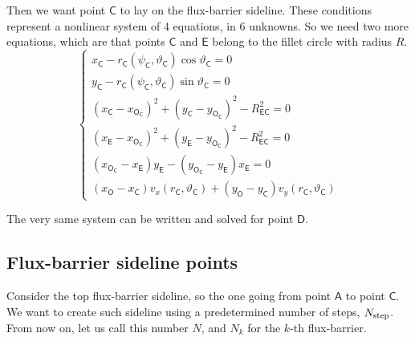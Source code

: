 \documentclass[b5paper,11pt,oneside,fleqn]{article}
\newcommand{\pt}[1]{\mathsf{#1}}
\newcommand{\te}{\vartheta}
\newcommand{\Nstep}{N_{\textup{step}}}
\begin{document}
Then we want point $ \pt{C} $ to lay on the flux-barrier sideline. These
conditions represent a nonlinear system of 4 equations, in 6 unknowns.
So we need two more equations, which are that points $ \pt{C} $ and $ \pt{E} $
belong to the fillet circle with radius $ R $.
\begin{equation}
\begin{cases}
x_\pt{C} - r_\pt{C}(\psi_\pt{C}, \te_\pt{C}) \cos\te_\pt{C} = 0 \\
y_\pt{C} - r_\pt{C}(\psi_\pt{C}, \te_\pt{C}) \sin\te_\pt{C} = 0 \\
%
(x_\pt{C} - x_\pt{O_\pt{C}})^2 + (y_\pt{C} - y_\pt{O_\pt{C}})^2
- R_\pt{EC}^2 = 0 \\
(x_\pt{E} - x_\pt{O_\pt{C}})^2 + (y_\pt{E} - y_\pt{O_\pt{C}})^2
- R_\pt{EC}^2 = 0 \\
%
(x_\pt{O_\pt{C}} - x_\pt{E}) y_\pt{E} -
(y_\pt{O_\pt{C}} - y_\pt{E}) x_\pt{E} = 0 \\
%
(x_\pt{O} - x_\pt{C}) v_x(r_\pt{C},\te_\pt{C}) +
(y_\pt{O} - y_\pt{C}) v_y(r_\pt{C},\te_\pt{C})
\end{cases}
\end{equation}

The very same system can be written and solved for point $ \pt{D} $.



\subsection{Flux-barrier sideline points}

Consider the top flux-barrier sideline, so the one going from point $ \pt{A} $ 
to point $ \pt{C} $.
We want to create such sideline using a predetermined number of steps,
$ \Nstep $. From now on, let us call this number $ N $, 
and $ N_k $ for the $ k $-th flux-barrier.
\end{document}
